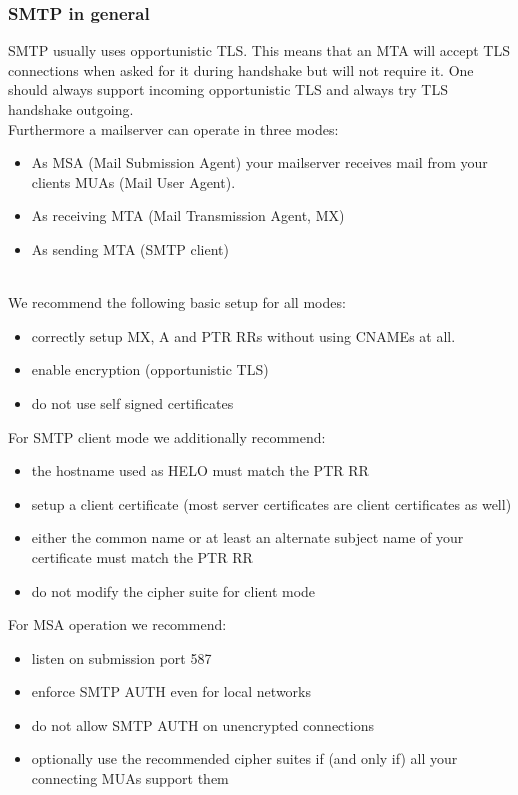 
\subsubsection{SMTP in general}

SMTP usually uses opportunistic TLS. This means that an MTA will accept TLS connections when asked for it during handshake but will not require it. One should always support incoming opportunistic TLS and always try TLS handshake outgoing.\\

Furthermore a mailserver can operate in three modes:
\begin{itemize}
\item As MSA (Mail Submission Agent) your mailserver receives mail from your clients MUAs (Mail User Agent).
\item As receiving MTA (Mail Transmission Agent, MX)
\item As sending MTA (SMTP client)
\end{itemize}
\mbox{}\\
We recommend the following basic setup for all modes:
\begin{itemize}
\item correctly setup MX, A and PTR RRs without using CNAMEs at all.
\item enable encryption (opportunistic TLS)
\item do not use self signed certificates
\end{itemize}

For SMTP client mode we additionally recommend:
\begin{itemize}
\item the hostname used as HELO must match the PTR RR
\item setup a client certificate (most server certificates are client certificates as well)
\item either the common name or at least an alternate subject name of your certificate must match the PTR RR
\item do not modify the cipher suite for client mode
\end{itemize}

For MSA operation we recommend:
\begin{itemize}
\item listen on submission port 587
\item enforce SMTP AUTH even for local networks
\item do not allow SMTP AUTH on unencrypted connections
\item optionally use the recommended cipher suites if (and only if) all your connecting MUAs support them
\end{itemize}



